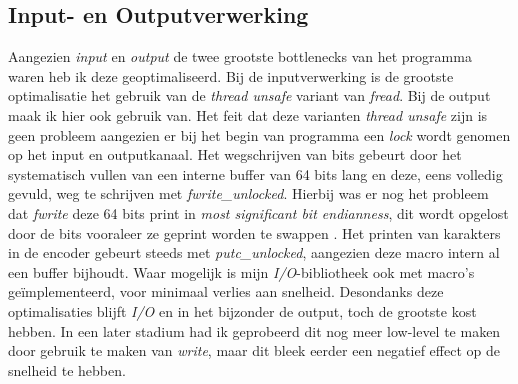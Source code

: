 \subsection{Input- en Outputverwerking}
Aangezien \emph{input} en \emph{output} de twee grootste bottlenecks van het programma waren heb ik deze geoptimaliseerd. Bij de inputverwerking is de grootste optimalisatie het gebruik van de \emph{thread unsafe} variant van \emph{fread}. Bij de output maak ik hier ook gebruik van. Het feit dat deze varianten \emph{thread unsafe} zijn is geen probleem aangezien er bij het begin van programma een \emph{lock} wordt genomen op het input en outputkanaal. Het wegschrijven van bits gebeurt door het systematisch vullen van een interne buffer van 64 bits lang en deze, eens volledig gevuld, weg te schrijven met \emph{fwrite\_unlocked}. Hierbij was er nog het probleem dat \emph{fwrite} deze 64 bits print in \emph{most significant bit endianness}, dit wordt opgelost door de bits vooraleer ze geprint worden te swappen \cite{64bitswaps}. Het printen van karakters in de encoder gebeurt steeds met \emph{putc\_unlocked}, aangezien deze macro intern al een buffer bijhoudt. Waar mogelijk is mijn \emph{I/O}-bibliotheek ook met macro's ge\"implementeerd, voor minimaal verlies aan snelheid. Desondanks deze optimalisaties blijft \emph{I/O} en in het bijzonder de output, toch de grootste kost hebben. In een later stadium had ik geprobeerd dit nog meer low-level te maken door gebruik te maken van \emph{write}, maar dit bleek eerder een negatief effect op de snelheid te hebben.